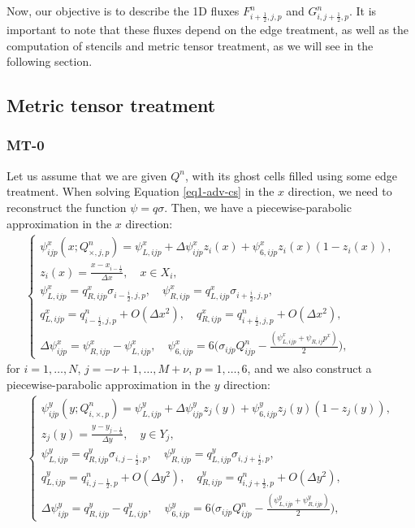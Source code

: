 Now, our objective is to describe the 1D fluxes ${F}_{i+\frac{1}{2},j,p}^n$ and ${G}_{i,j+\frac{1}{2},p}^n$. 
It is important to note that these fluxes depend on the edge treatment, as well as the computation of stencils
and metric tensor treatment, as we will see in the following section.

\subsection{Metric tensor treatment}
\label{mt}
\subsubsection{MT-0}
\label{mt-0}
Let us assume that we are given $Q^n$, with its ghost cells filled using some edge treatment.
When solving Equation \eqref{eq1-adv-cs} in the $x$ direction, we need to reconstruct the function $\psi = q\sigma$.
Then, we have a piecewise-parabolic approximation in the $x$ direction:
\begin{align}
	\label{chp5-ppmx-eq1}
	\begin{cases}
		 \psi_{ijp}^x(x;Q_{\times, j,p}^n) = {\psi}_{L,ijp}^x + \Delta {\psi}_{ijp}^x z_i(x) + {\psi}_{6,ijp}^xz_i(x)(1-z_i(x)), \\
		z_i(x) = \frac{x-x_{i-\frac{1}{2}}}{\Delta x},
		\quad x \in X_i,\\
		\psi_{L,ijp}^x  = q_{R,ijp}^x \sigma_{i-\frac{i}{2},j,p}, \quad
		\psi_{R,ijp}^x  = q_{L,ijp}^x \sigma_{i+\frac{i}{2},j,p}, \\
		q_{L,ijp}^x = q_{i-\frac{i}{2},j,p}^n+ O(\Delta x^2),\quad
		q_{R,ijp}^x = q_{i+\frac{i}{2},j,p}^n+ O(\Delta x^2),\\
		\Delta \psi_{ijp}^x = \psi_{R, ijp}^x - \psi_{L, ijp}^x,\quad
		\psi_{6,ijp}^x = 6\bigg(\sigma_{ijp}Q_{ijp}^n - \frac{(\psi_{L,ijp}^x + \psi_{R,ij}p^x)}{2}\bigg),
	\end{cases}
\end{align}
for $i=1, \ldots, N$, $j=-\nu+1, \ldots, M + \nu$, $p=1,\ldots,6$,
and we also construct a piecewise-parabolic approximation in the $y$ direction:
\begin{align}
	\label{chp5-ppmy-eq2}
	\begin{cases}
		\psi_{ijp}^y(y;Q_{i,\times,p}^n) = \psi_{L,ijp}^y + \Delta \psi_{ijp}^y z_j(y) + \psi_{6,ijp}^yz_j(y)(1-z_j(y)),\\ 
		z_j(y) = \frac{y-y_{j-\frac{1}{2}}}{\Delta y},
		\quad y \in Y_j,\\
		\psi_{L,ijp}^y  = q_{R,ijp}^y \sigma_{i,j-\frac{i}{2},p}, \quad
		\psi_{R,ijp}^y  = q_{L,ijp}^y \sigma_{i,j+\frac{i}{2},p}, \\
		q_{L,ijp}^y = q_{i,j-\frac{1}{2},p}^n+ O(\Delta y^2),\quad
		q_{R,ijp}^y = q_{i,j+\frac{1}{2},p}^n+ O(\Delta y^2),\\
		\Delta \psi_{ijp}^y = q_{R,ijp}^y - q_{L,ijp}^y,\quad 
		\psi_{6,ijp}^y = 6\bigg(\sigma_{ijp}Q_{ijp}^n - \frac{(\psi_{L,ijp}^y + \psi_{R,ijp}^y)}{2}\bigg),
	\end{cases}
\end{align}

